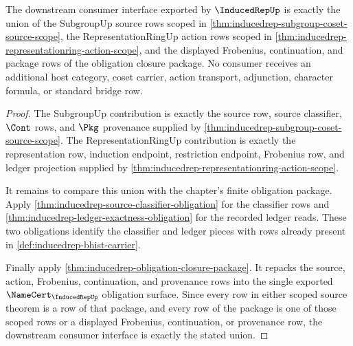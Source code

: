 \begin{theorem}
\label{thm:inducedrep-consumer-obligation-exhaustion}
The downstream consumer interface exported by $\InducedRepUp$ is exactly the
union of the SubgroupUp source rows scoped in
\autoref{thm:inducedrep-subgroup-coset-source-scope}, the
RepresentationRingUp action rows scoped in
\autoref{thm:inducedrep-representationring-action-scope}, and the displayed
Frobenius, continuation, and package rows of the obligation closure package.
No consumer receives an additional host category, coset carrier, action
transport, adjunction, character formula, or standard bridge row.
\end{theorem}
\begin{proof}
The SubgroupUp contribution is exactly the source row, source classifier,
$\Cont$ rows, and $\Pkg$ provenance supplied by
\autoref{thm:inducedrep-subgroup-coset-source-scope}. The
RepresentationRingUp contribution is exactly the representation row, induction
endpoint, restriction endpoint, Frobenius row, and ledger projection supplied
by \autoref{thm:inducedrep-representationring-action-scope}.

It remains to compare this union with the chapter's finite obligation package.
Apply \autoref{thm:inducedrep-source-classifier-obligation} for the classifier
rows and \autoref{thm:inducedrep-ledger-exactness-obligation} for the recorded
ledger reads. These two obligations identify the classifier and ledger pieces
with rows already present in \autoref{def:inducedrep-bhist-carrier}.

Finally apply \autoref{thm:inducedrep-obligation-closure-package}. It repacks
the source, action, Frobenius, continuation, and provenance rows into the
single exported $\NameCert_{\InducedRepUp}$ obligation surface. Since every
row in either scoped source theorem is a row of that package, and every row of
the package is one of those scoped rows or a displayed Frobenius,
continuation, or provenance row, the downstream consumer interface is exactly
the stated union.
\end{proof}

